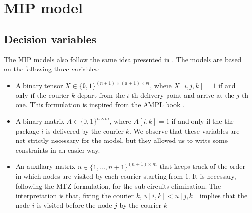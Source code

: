\section{MIP model}


\subsection{Decision variables}

The MIP models also follow the same idea presented in .
The models are based on the following three variables:
\begin{itemize}
    \item A binary tensor $X \in \{0,1\}^{(n+1) \times (n+1) \times m}$, where $X[i,j,k] = 1$ if and only if the courier $k$ depart from the $i$-th delivery point and arrive at the $j$-th one. This formulation is inspired from the AMPL book \cite{AMPLbook}.

    \item A binary matrix $A \in \{0,1\}^{n \times m}$, where $A[i,k] = 1$ if and only if the the package $i$ is delivered by the courier $k$. We observe that these variables are not strictly necessary for the model, but they allowed us to write some constraints in an easier way.

    \item An auxiliary matrix $u \in \{1,\dots,n+1\}^{(n+1) \times m}$ that keeps track of the order in which nodes are visited by each courier starting from $1$. It is necessary, following the MTZ formulation, for the sub-circuits elimination. The interpretation is that, fixing the courier $k$, $u[i,k] < u[j,k]$ implies that the node $i$ is visited before the node $j$ by the courier $k$.
\end{itemize}


